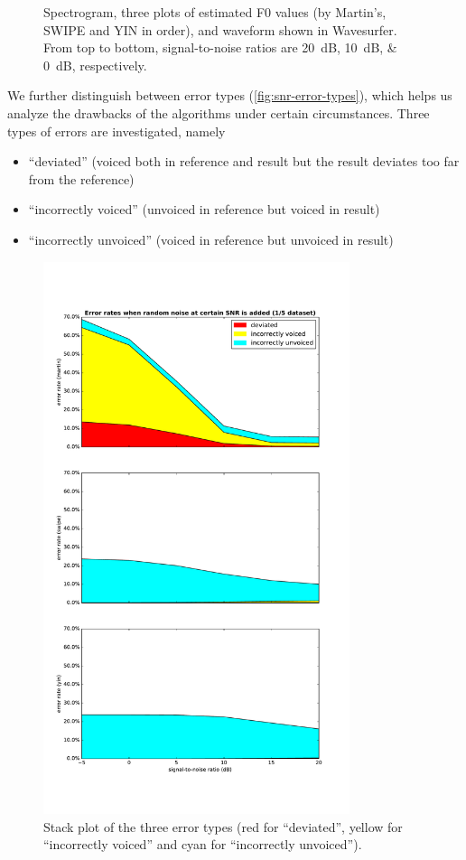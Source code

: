 \documentclass[11pt,a4paper]{report}
\begin{document}
\begin{figure}[htbp]
  \caption[Visualization of distortions.]{Spectrogram, three plots of estimated F0 values (by Martin's, SWIPE and YIN in order), and waveform shown in Wavesurfer.
    From top to bottom, signal-to-noise ratios are \SIlist{20;10;0}{\deci\bel}, respectively.}
  \label{fig:snr-compare}
\end{figure}

We further distinguish between error types (\autoref{fig:snr-error-types}), which helps us analyze the drawbacks of the algorithms under certain circumstances.
Three types of errors are investigated, namely

\begin{itemize}
  \item \enquote{deviated} (voiced both in reference and result but the result deviates too far from the reference)
  \item \enquote{incorrectly voiced} (unvoiced in reference but voiced in result)
  \item \enquote{incorrectly unvoiced} (voiced in reference but unvoiced in result)
\end{itemize}

\begin{figure}[htbp]
  \centering
  \includegraphics[width=0.8\textwidth]{error_rates_vs_snrs_error_types.pdf}
  \caption[Stack plot of the three error types.]{Stack plot of the three error types (red for \enquote{deviated}, yellow for \enquote{incorrectly voiced} and cyan for \enquote{incorrectly unvoiced}).} \label{fig:snr-error-types}
\end{figure}
\end{document}
